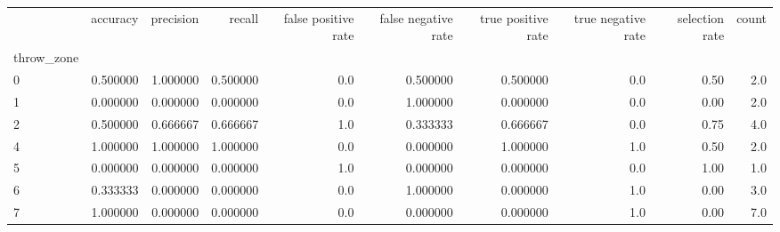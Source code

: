 \begin{tabular}{lrrrrrrrrr}
\toprule
{} &  accuracy &  precision &    recall &  false positive rate &  false negative rate &  true positive rate &  true negative rate &  selection rate &  count \\
throw\_zone &           &            &           &                      &                      &                     &                     &                 &        \\
\midrule
0          &  0.500000 &   1.000000 &  0.500000 &                  0.0 &             0.500000 &            0.500000 &                 0.0 &            0.50 &    2.0 \\
1          &  0.000000 &   0.000000 &  0.000000 &                  0.0 &             1.000000 &            0.000000 &                 0.0 &            0.00 &    2.0 \\
2          &  0.500000 &   0.666667 &  0.666667 &                  1.0 &             0.333333 &            0.666667 &                 0.0 &            0.75 &    4.0 \\
4          &  1.000000 &   1.000000 &  1.000000 &                  0.0 &             0.000000 &            1.000000 &                 1.0 &            0.50 &    2.0 \\
5          &  0.000000 &   0.000000 &  0.000000 &                  1.0 &             0.000000 &            0.000000 &                 0.0 &            1.00 &    1.0 \\
6          &  0.333333 &   0.000000 &  0.000000 &                  0.0 &             1.000000 &            0.000000 &                 1.0 &            0.00 &    3.0 \\
7          &  1.000000 &   0.000000 &  0.000000 &                  0.0 &             0.000000 &            0.000000 &                 1.0 &            0.00 &    7.0 \\
\bottomrule
\end{tabular}
